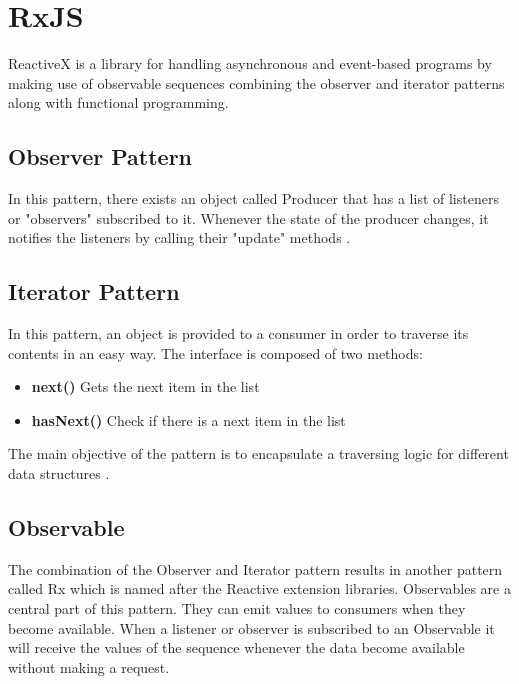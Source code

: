 \documentclass[12pt]{report}
\begin{document}
\section{RxJS}

ReactiveX is a library for handling asynchronous and event-based programs by making use of observable sequences combining the observer and iterator patterns along with functional programming\cite{reactiveX}.

\subsection{Observer Pattern}
In this pattern, there exists an object called Producer that has a list of listeners or "observers" subscribed to it. Whenever the state of the producer changes, it notifies the listeners by calling their "update" methods \cite{mansilla2018reactive}.

\subsection{Iterator Pattern}
In this pattern, an object is provided to a consumer in order to traverse its contents in an easy way. The interface is composed of two methods: 
\begin{itemize}
  \item \textbf{next()} Gets the next item in the list
  \item \textbf{hasNext()} Check if there is a next item in the list
\end{itemize}
The main objective of the pattern is to encapsulate a traversing logic for different data structures \cite{mansilla2018reactive}.
\subsection{Observable}
The combination of the Observer and Iterator pattern results in another pattern called Rx which is named after the Reactive extension libraries. Observables are a central part of this pattern. They can emit values to consumers when they become available. When a listener or observer is subscribed to an Observable it will receive the values of the sequence whenever the data become available without making a request.
\end{document}
